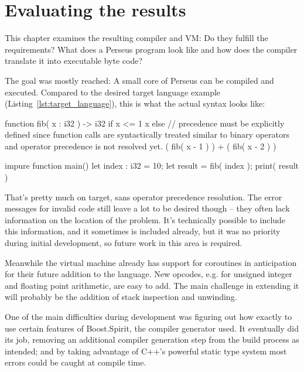 

\chapter{Evaluating the results}
This chapter examines the resulting compiler and VM: Do they fulfill the requirements? What does a Perseus program look like and how does the compiler translate it into executable byte code?

The goal was mostly reached: A small core of Perseus can be compiled and executed. Compared to the desired target language example (Listing~\ref{lst:target_language}), this is what the actual syntax looks like:

\begin{perseuslisting}[caption={Actual resulting language example},label={lst:result_language}]
function fib( x : i32 ) -> i32
    if x <= 1
        x
    else
    	// precedence must be explicitly defined since function calls are syntactically treated similar to binary operators and operator precedence is not resolved yet.
        ( fib( x - 1 ) ) + ( fib( x - 2 ) )

impure function main()
{
	let index : i32 = 10;
	let result = fib( index );
	print( result )
}
\end{perseuslisting}

That's pretty much on target, sans operator precedence resolution. The error messages for invalid code still leave a lot to be desired though -- they often lack information on the location of the problem. It's technically possible to include this information, and it sometimes is included already, but it was no priority during initial development, so future work in this area is required.

Meanwhile the virtual machine already has support for coroutines in anticipation for their future addition to the language. New opcodes, e.g. for unsigned integer and floating point arithmetic, are easy to add. The main challenge in extending it will probably be the addition of stack inspection and unwinding.

One of the main difficulties during development was figuring out how exactly to use certain features of Boost.Spirit, the compiler generator used. It eventually did its job, removing an additional compiler generation step from the build process as intended; and by taking advantage of C++'s powerful static type system most errors could be caught at compile time.

